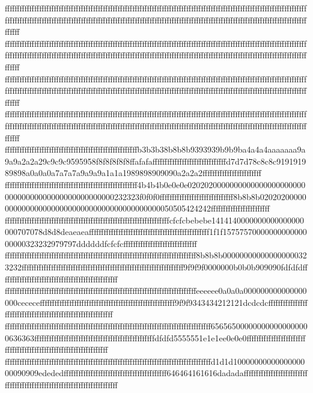 {{{ffffffffffffffffffffffffffffffffffffffffffffffffffffffffffffffffffffffffffffffffffffffffffffffffffffffffffffffffffffffffffffffffffffffffffffffffffffffffffffffffffffffffffffffffffffffffffffffffffffffffffffffffffffffffffffffffffffffffffffffffffffffffffff
ffffffffffffffffffffffffffffffffffffffffffffffffffffffffffffffffffffffffffffffffffffffffffffffffffffffffffffffffffffffffffffffffffffffffffffffffffffffffffffffffffffffffffffffffffffffffffffffffffffffffffffffffffffffffffffffffffffffffffffffffffffffffffff
ffffffffffffffffffffffffffffffffffffffffffffffffffffffffffffffffffffffffffffffffffffffffffffffffffffffffffffffffffffffffffffffffffffffffffffffffffffffffffffffffffffffffffffffffffffffffffffffffffffffffffffffffffffffffffffffffffffffffffffffffffffffffffff
ffffffffffffffffffffffffffffffffffffffffffffffffffffffffffffffffffffffffffffffffffffffffffffffffffffffffffffffffffffffffffffffffffffffffffffffffffffffffffffffffffffffffffffffffffffffffffffffffffffffffffffffffffffffffffffffffffffffffffffffffffffffffffff
ffffffffffffffffffffffffffffffffffffffffffffffffffffffb3b3b38b8b8b9393939b9b9ba4a4a4aaaaaaa9a9a9a2a2a29c9c9c9595958f8f8f8f8f8ffafafaffffffffffffffffffffffffffffffd7d7d78c8c8c919191989898a0a0a0a7a7a7a9a9a9a1a1a1989898909090a2a2a2ffffffffffffffffffffffff
ffffffffffffffffffffffffffffffffffffffffffffffffffffff4b4b4b0e0e0e020202000000000000000000000000000000000000000000000000232323f0f0f0ffffffffffffffffffffffffffffff8b8b8b020202000000000000000000000000000000000000000000050505424242ffffffffffffffffffffffff
fffffffffffffffffffffffffffffffffffffffffffffffffffffffffffffffffffcfcfcbebebe1414140000000000000000000707078d8d8deaeaeafffffffffffffffffffffffffffffffffffffffffffffffff1f1f1575757000000000000000000323232979797ddddddfcfcfcffffffffffffffffffffffffffffff
ffffffffffffffffffffffffffffffffffffffffffffffffffffffffffffffffffffffffffffff8b8b8b000000000000000000323232ffffffffffffffffffffffffffffffffffffffffffffffffffffffffffffffffff9f9f9f0000000b0b0b909090fdfdfdffffffffffffffffffffffffffffffffffffffffffffffff
ffffffffffffffffffffffffffffffffffffffffffffffffffffffffffffffffffffffffffffffeeeeee0a0a0a000000000000000000cececefffffffffffffffffffffffffffffffffffffffffffffffffffffff9f9f9343434212121dcdcdcffffffffffffffffffffffffffffffffffffffffffffffffffffffffffff
ffffffffffffffffffffffffffffffffffffffffffffffffffffffffffffffffffffffffffffffffffff656565000000000000000000636363fffffffffffffffffffffffffffffffffffffffffffffffffdfdfd5555551e1e1ee0e0e0ffffffffffffffffffffffffffffffffffffffffffffffffffffffffffffffffff
ffffffffffffffffffffffffffffffffffffffffffffffffffffffffffffffffffffffffffffffffffffd1d1d1000000000000000000090909edededffffffffffffffffffffffffffffffffffffffffff646464161616dadadaffffffffffffffffffffffffffffffffffffffffffffffffffffffffffffffffffffffff
}}}
